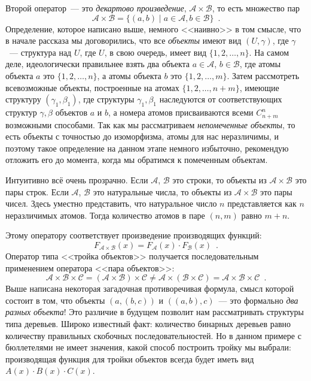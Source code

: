 \documentclass[a5paper]{article}
\theoremstyle{definition}
\begin{document}
Второй оператор~--- это \textit{декартово произведение}, \( \mathcal A \times 
\mathcal B \), то 
есть множество пар
\[
	\mathcal A \times \mathcal B = \{ (a, b) \mid a \in \mathcal A, b \in 
	\mathcal B \} \enspace .
\]
Определение, которое написано выше, немного <<наивно>> в том смысле, что в 
начале рассказа мы договорились, что все \textit{объекты} имеют вид \( (U, 
\gamma) \), где \( \gamma \)~--- структура над \( U \), где \( U \), в свою 
очередь, имеет вид \( \{ 1, 2, \ldots, n \} \). На самом деле, идеологически 
правильнее взять два объекта \( a \in \mathcal A \), \( b \in \mathcal B \), 
где атомы объекта \( a \) это \( \{ 1, 2, \ldots, n \} \), а атомы объекта \( b 
\) это \( \{1,2,\ldots, m  \} \). Затем рассмотреть всевозможные объекты, 
построенные на атомах \( \{ 1, 2, \ldots, n+m \} \), имеющие структуру \( 
(\gamma_1, \beta_1) \), где структуры \( \gamma_1, \beta_1 \) наследуются от  
соответствующих структур \( \gamma, \beta \) объектов \( a \) и \( b \), а 
номера атомов присваиваются всеми \( 
C_{n+m}^{n} \) возможными способами. Так как мы рассматриваем 
\textit{непомеченные объекты}, то есть объекты с точностью до изоморфизма, 
атомы для нас неразличимы, и поэтому такое определение на данном этапе немного 
избыточно, рекомендую отложить его до момента, когда мы обратимся к помеченным 
объектам.

Интуитивно всё очень прозрачно. Если \( \mathcal A \), \( \mathcal B \) это 
строки, то объекты из \( \mathcal A \times \mathcal B \) это пары строк. Если 
\( \mathcal A \), \( \mathcal B \) это натуральные числа, то объекты из \( 
\mathcal A \times \mathcal B \) это пары чисел. Здесь уместно представить, что 
натуральное число \( n \) представляется как \( n \) неразличимых атомов. Тогда 
количество атомов в паре \( (n, m) \) равно \( m + n \).

Этому оператору 
соответствует произведение 
производящих функций:
\[
	F_{\mathcal A \times \mathcal B}(x) = F_{\mathcal A}(x) \cdot F_{\mathcal 
	B}(x) \enspace.
\]
Оператор типа <<тройка объектов>> получается последовательным применением 
оператора <<пара объектов>>:
\[
	\mathcal A \times \mathcal B \times \mathcal C = (\mathcal A \times 
	\mathcal B) \times \mathcal C \neq \mathcal A \times (\mathcal B \times 
	\mathcal C) = \mathcal A 
	\times \mathcal B \times \mathcal C
	\enspace .
\]
Выше написана некоторая загадочная противоречивая формула, смысл которой 
состоит в том, что объекты \( (a, (b, c)) \) и \( ((a, b), c) \)~--- это 
формально \textit{два разных объекта}! Это различие в будущем позволит нам 
рассматривать структуры типа деревьев. Широко известный факт: количество 
бинарных деревьев равно количеству правильных скобочных последовательностей. Но 
в данном примере с бюллетелями не имеет значения, какой способ построить тройку 
мы выбрали: производящая функция для тройки объектов всегда будет иметь вид \( 
A(x) \cdot B(x) \cdot C(x) \).
\end{document}
